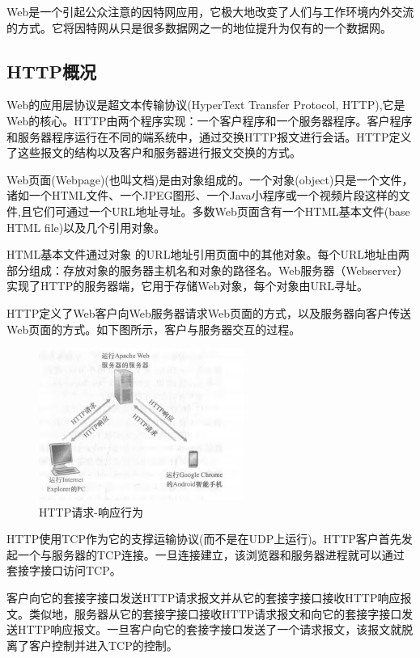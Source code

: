     Web是一个引起公众注意的因特网应用，它极大地改变了人们与工作环境内外交流的方式。它将因特网从只是很多数据网之一的地位提升为仅有的一个数据网。

\subsection{HTTP概况}

    Web的应用层协议是超文本传输协议(HyperText Transfer Protocol, HTTP),它是Web的核心。HTTP由两个程序实现：一个客户程序和一个服务器程序。客户程序和服务器程序运行在不同的端系统中，通过交换HTTP报文进行会话。HTTP定义了这些报文的结构以及客户和服务器进行报文交换的方式。

    Web页面(Webpage)(也叫文档)是由对象组成的。一个对象(object)只是一个文件，诸如一个HTML文件、一个JPEG图形、一个Java小程序或一个视频片段这样的文件,且它们可通过一个URL地址寻址。多数Web页面含有一个HTML基本文件(base HTML file)以及几个引用对象。

    HTML基本文件通过对象 的URL地址引用页面中的其他对象。每个URL地址由两部分组成：存放对象的服务器主机名和对象的路径名。Web服务器（Webserver）实现了HTTP的服务器端，它用于存储Web对象，每个对象由URL寻址。

    HTTP定义了Web客户向Web服务器请求Web页面的方式，以及服务器向客户传送Web页面的方式。如下图所示，客户与服务器交互的过程。

\begin{figure}[!htbp]
    \centering
    \includegraphics[width=0.6\textwidth]{image/chapter02/HTTP服务.png}
    \caption{HTTP请求-响应行为}
\end{figure}

    HTTP使用TCP作为它的支撑运输协议(而不是在UDP上运行)。HTTP客户首先发起一个与服务器的TCP连接。一旦连接建立，该浏览器和服务器进程就可以通过套接字接口访问TCP。

    客户向它的套接字接口发送HTTP请求报文并从它的套接字接口接收HTTP响应报文。类似地，服务器从它的套接字接口接收HTTP请求报文和向它的套接字接口发送HTTP响应报文。一旦客户向它的套接字接口发送了一个请求报文，该报文就脱离了客户控制并进入TCP的控制。

